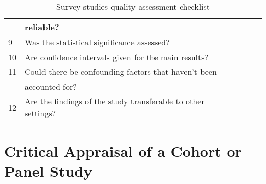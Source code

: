 \begin{table}[H]
\begin{center}
{\begin{tabular}{|l||l|l|l|l|}
                           & reliable?                                                        &&& \\
                        \hline
                        9  & Was the statistical significance assessed?                       &&& \\
                        \hline
                        10 & Are confidence intervals given for the main results?             &&& \\
                        \hline
                        11 & Could there be confounding factors that haven’t been             &&& \\
                           & accounted for?                                                   &&& \\
                        \hline
                        12 & Are the findings of the study transferable to other settings?    &&& \\
                        \hline
                \end{tabular}}
        \end{center}
        \caption{Survey studies quality assessment checklist}
        \label{table:surveyStudy}
\end{table}
    

\section*{Critical Appraisal of a Cohort or Panel Study}

